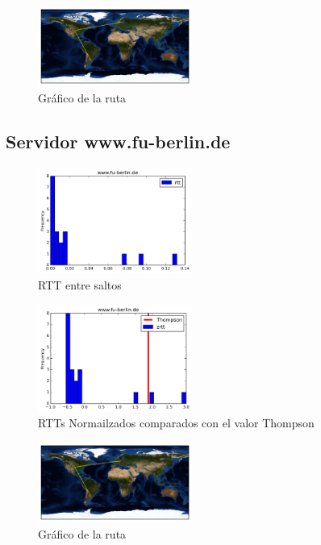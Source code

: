 \begin{figure}[H]
  \centering
    \includegraphics[width=0.45\textwidth]{grafico-rutas/unis-no.png}
  \caption{Gráfico de la ruta}
  \label{entropia-s}
\end{figure}




\subsection{Servidor www.fu-berlin.de}
\begin{figure}[H]
  \centering
    \includegraphics[width=0.45\textwidth]{histogramas_rtt/www-fu-berlin-de.png}
  \caption{RTT entre saltos}
  \label{entropia-s}
\end{figure}

\begin{figure}[H]
  \centering
    \includegraphics[width=0.45\textwidth]{histogramas_thompson/www-fu-berlin-de.png}
  \caption{RTTs Normailzados comparados con el valor Thompson}
  \label{entropia-s}
\end{figure}

\begin{figure}[H]
  \centering
    \includegraphics[width=0.45\textwidth]{grafico-rutas/www-fu-berlin-de.png}
  \caption{Gráfico de la ruta}
  \label{entropia-s}
\end{figure}




